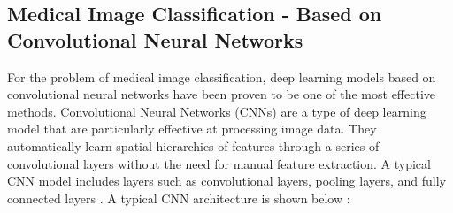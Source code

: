 





\subsection{Medical Image Classification - Based on Convolutional Neural Networks}

For the problem of medical image classification, deep learning models based on convolutional neural networks have been proven to be one of the most effective methods\cite{5.1 1}.
Convolutional Neural Networks (CNNs) are a type of deep learning model that are particularly effective at processing image data. They automatically learn spatial hierarchies of features through a series of convolutional layers without the need for manual feature extraction. A typical CNN model includes layers such as convolutional layers, pooling layers, and fully connected layers \cite{DL.4}. A typical CNN architecture is shown below
:\cite{4.30 1}



